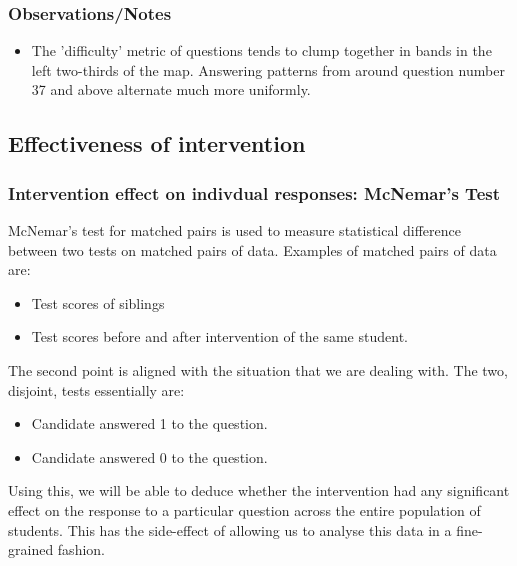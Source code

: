 \documentclass[10pt]{article}
\begin{document}
\subsubsection{Observations/Notes}
\begin{itemize}
\item The 'difficulty' metric of questions tends to clump together in bands in the left two-thirds of the map. Answering patterns from around question number 37 and above alternate much more uniformly.
\end{itemize}

\subsection{Effectiveness of intervention}
\subsubsection{Intervention effect on indivdual responses: McNemar's Test}
McNemar's test for matched pairs is used to measure statistical difference between two tests on matched pairs of data. Examples of matched pairs of data are:
\begin{itemize}
\item Test scores of siblings
\item Test scores before and after intervention of the same student.
\end{itemize}
The second point is aligned with the situation that we are dealing with. The two, disjoint, tests essentially are:
\begin{itemize}
\item Candidate answered 1 to the question.
\item Candidate answered 0 to the question.
\end{itemize}
Using this, we will be able to deduce whether the intervention had any significant effect on the response to a particular question across the entire population of students. This has the side-effect of allowing us to analyse this data in a fine-grained fashion.
\end{document}
